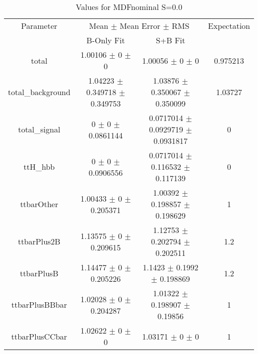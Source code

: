 \begin{table}
\centering
\caption{Values for MDFnominal S=0.0}
\begin{tabular}{cccc}
\toprule
Parameter & \multicolumn{2}{c}{Mean $\pm$ Mean Error $\pm$ RMS} & Expectation\\
 & B-Only Fit & S+B Fit & \\
\midrule
total & \num{1.00106} $\pm$ \num{0} $\pm$ \num{0} & \num{1.00056} $\pm$ \num{0} $\pm$ \num{0} & \num{0.975213}\\
total\_background & \num{1.04223} $\pm$ \num{0.349718} $\pm$ \num{0.349753} & \num{1.03876} $\pm$ \num{0.350067} $\pm$ \num{0.350099} & \num{1.03727}\\
total\_signal & \num{0} $\pm$ \num{0} $\pm$ \num{0.0861144} & \num{0.0717014} $\pm$ \num{0.0929719} $\pm$ \num{0.0931817} & \num{0}\\
ttH\_hbb & \num{0} $\pm$ \num{0} $\pm$ \num{0.0906556} & \num{0.0717014} $\pm$ \num{0.116532} $\pm$ \num{0.117139} & \num{0}\\
ttbarOther & \num{1.00433} $\pm$ \num{0} $\pm$ \num{0.205371} & \num{1.00392} $\pm$ \num{0.198857} $\pm$ \num{0.198629} & \num{1}\\
ttbarPlus2B & \num{1.13575} $\pm$ \num{0} $\pm$ \num{0.209615} & \num{1.12753} $\pm$ \num{0.202794} $\pm$ \num{0.202511} & \num{1.2}\\
ttbarPlusB & \num{1.14477} $\pm$ \num{0} $\pm$ \num{0.205226} & \num{1.1423} $\pm$ \num{0.1992} $\pm$ \num{0.198869} & \num{1.2}\\
ttbarPlusBBbar & \num{1.02028} $\pm$ \num{0} $\pm$ \num{0.204287} & \num{1.01322} $\pm$ \num{0.198907} $\pm$ \num{0.19856} & \num{1}\\
ttbarPlusCCbar & \num{1.02622} $\pm$ \num{0} $\pm$ \num{0} & \num{1.03171} $\pm$ \num{0} $\pm$ \num{0} & \num{1}\\
\bottomrule
\end{tabular}
\end{table}